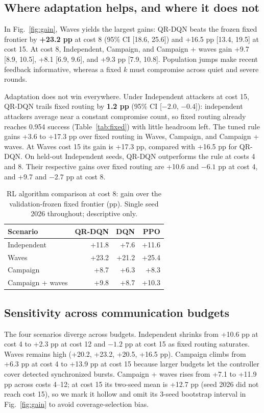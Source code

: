 \documentclass[10pt,twocolumn]{article}
\begin{document}
\subsection{Where adaptation helps, and where it does not}
In Fig.~\ref{fig:gain}, Waves yields the largest gains: QR-DQN beats the frozen fixed frontier by \textbf{+23.2 pp} at cost 8 (95\% CI [18.6, 25.6]) and +16.5 pp [13.4, 19.5] at cost 15. At cost 8, Independent, Campaign, and Campaign + waves gain +9.7 [8.9, 10.5], +8.1 [6.9, 9.6], and +9.3 pp [7.9, 10.8]. Population jumps make recent feedback informative, whereas a fixed $k$ must compromise across quiet and severe rounds.

Adaptation does not win everywhere. Under Independent attackers at cost 15, QR-DQN trails fixed routing by \textbf{1.2 pp} (95\% CI [$-2.0$, $-0.4$]): independent attackers average near a constant compromise count, so fixed routing already reaches 0.954 success (Table~\ref{tab:fixed}) with little headroom left. The tuned rule gains +3.6 to +17.3 pp over fixed routing in Waves, Campaign, and Campaign + waves. At Waves cost 15 its gain is +17.3 pp, compared with +16.5 pp for QR-DQN. On held-out Independent seeds, QR-DQN outperforms the rule at costs 4 and 8. Their respective gains over fixed routing are +10.6 and $-6.1$ pp at cost 4, and +9.7 and $-2.7$ pp at cost 8.

\begin{table}[t]
\centering
\caption{RL algorithm comparison at cost 8: gain over the validation-frozen fixed frontier (pp). Single seed 2026 throughout; descriptive only.}
\label{tab:rl}
\footnotesize
\setlength{\tabcolsep}{4.2pt}
\begin{tabular}{@{}lrrr@{}}
\toprule
Scenario & QR-DQN & DQN & PPO\\
\midrule
Independent & +11.8 & +7.6 & +11.6\\
Waves & +23.2 & +21.2 & +25.4\\
Campaign & +8.7 & +6.3 & +8.3\\
Campaign + waves & +9.8 & +8.7 & +10.3\\
\bottomrule
\end{tabular}
\end{table}

\subsection{Sensitivity across communication budgets}
The four scenarios diverge across budgets. Independent shrinks from +10.6 pp at cost 4 to +2.3 pp at cost 12 and $-1.2$ pp at cost 15 as fixed routing saturates. Waves remains high (+20.2, +23.2, +20.5, +16.5 pp). Campaign climbs from +6.3 pp at cost 4 to +13.9 pp at cost 15 because larger budgets let the controller cover detected synchronized bursts. Campaign + waves rises from +7.1 to +11.9 pp across costs 4--12; at cost 15 its two-seed mean is +12.7 pp (seed 2026 did not reach cost 15), so we mark it hollow and omit its 3-seed bootstrap interval in Fig.~\ref{fig:gain} to avoid coverage-selection bias.
\end{document}
